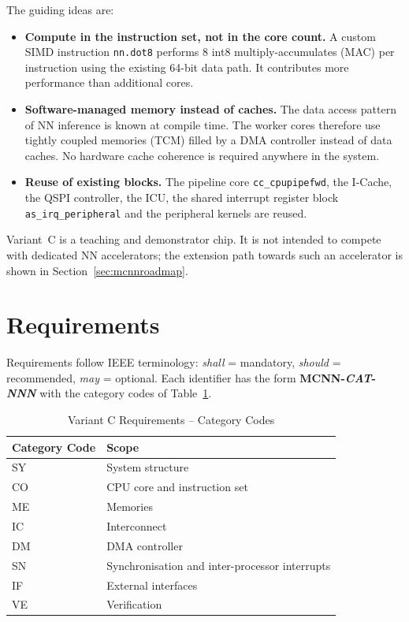 The guiding ideas are:
\begin{itemize}
  \item \textbf{Compute in the instruction set, not in the core count.}
    A custom SIMD instruction \texttt{nn.dot8} performs 8 int8
    multiply-accumulates (MAC) per instruction using the existing 64-bit
    data path. It contributes more performance than additional cores.
  \item \textbf{Software-managed memory instead of caches.}
    The data access pattern of NN inference is known at compile time.
    The worker cores therefore use tightly coupled memories (TCM) filled by
    a DMA controller instead of data caches. No hardware cache coherence
    is required anywhere in the system.
  \item \textbf{Reuse of existing blocks.}
    The pipeline core \texttt{cc\_cpupipefwd}, the I-Cache, the QSPI
    controller, the ICU, the shared interrupt register block
    \texttt{as\_irq\_peripheral} and the peripheral kernels are reused.
\end{itemize}

Variant~C is a teaching and demonstrator chip. It is not intended to
compete with dedicated NN accelerators; the extension path towards such an
accelerator is shown in Section~\ref{sec:mcnnroadmap}.

\section{Requirements}
\label{sec:mcnnreq}

Requirements follow IEEE terminology:
\textit{shall} = mandatory, \textit{should} = recommended,
\textit{may} = optional.
Each identifier has the form \textbf{MCNN-\textit{CAT}-\textit{NNN}}
with the category codes of Table~\ref{tab:mcnnReqCat}.

\begin{table}[H]
\caption{Variant C Requirements -- Category Codes}
\label{tab:mcnnReqCat}
\centering
\begin{tabularx}{\textwidth}{|l |X|}
  \hline
  Category Code & Scope \\
  \hline
  \hline
  SY & System structure \\
  \hline
  CO & CPU core and instruction set \\
  \hline
  ME & Memories \\
  \hline
  IC & Interconnect \\
  \hline
  DM & DMA controller \\
  \hline
  SN & Synchronisation and inter-processor interrupts \\
  \hline
  IF & External interfaces \\
  \hline
  VE & Verification \\
  \hline
\end{tabularx}
\end{table}

